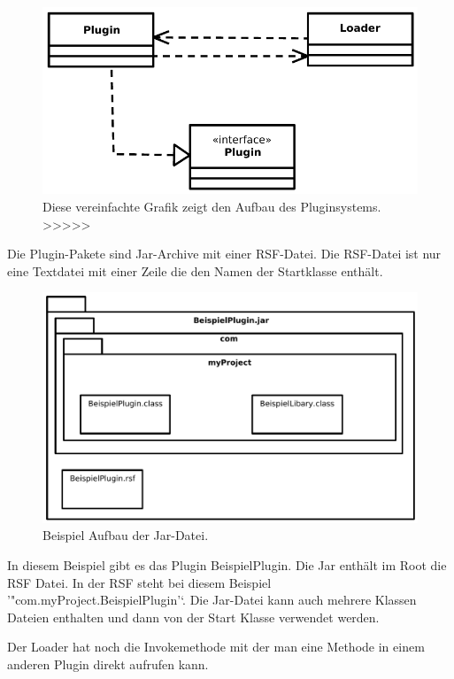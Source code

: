 \documentclass[a4paper,11pt,abstracton,titlepage]{scrartcl}
\begin{document}
\begin{figure}[hb]
  \centering
\includegraphics[width=\dimexpr\textwidth]{pluginsystem.pdf}
  \caption[GUI Beschreibung]%
  {
Diese vereinfachte Grafik zeigt den Aufbau des Pluginsystems. >>>>> 
}
\end{figure}

Die Plugin-Pakete sind Jar-Archive mit einer RSF-Datei.
Die RSF-Datei ist nur eine Textdatei mit einer Zeile die den Namen der
Startklasse enthält.

\begin{figure}
  \centering
\includegraphics[width=\dimexpr\textwidth]{beispieljar.pdf}
  \caption[GUI Beschreibung]%
  {
Beispiel Aufbau der Jar-Datei.
}
\end{figure}

In diesem Beispiel gibt es das Plugin BeispielPlugin.
Die Jar enthält im Root die RSF Datei. In der RSF steht bei diesem Beispiel
'"com.myProject.BeispielPlugin'`.
Die Jar-Datei kann auch mehrere Klassen Dateien enthalten und dann von der Start
Klasse verwendet werden.

Der Loader hat noch die Invokemethode mit der man eine Methode in einem anderen
Plugin direkt aufrufen kann.
\end{document}
